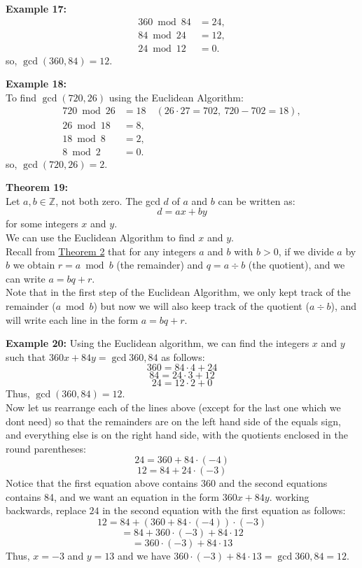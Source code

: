 \documentclass[12pt]{article}
\begin{document}
\noindent\textbf{Example 17:}
\label{ex:euclid360}
\begin{align*}
360 \bmod 84 &= 24, \\
84 \bmod 24 &= 12, \\
24 \bmod 12 &= 0.
\end{align*}
so, $\gcd(360,84) = 12$.

\vspace{5mm}

\noindent\textbf{Example 18:}
\label{ex:euclid720}
\\To find $\gcd(720,26)$ using the Euclidean Algorithm:
\begin{align*}
720 \bmod 26 &= 18 \quad(26\cdot 27 = 702,\ 720-702=18), \\   
26 \bmod 18 &= 8, \\
18 \bmod 8 &= 2, \\
8 \bmod 2 &= 0.
\end{align*}
so, $\gcd(720,26) = 2$.

\newpage
\noindent\textbf{Theorem 19:}
\label{thm:bezout}
\\Let $a,b \in \mathbb{Z}$, not both zero. 
The gcd $d$ of $a$ and $b$ can be written as:
\[
d = ax + by
\]
for some integers $x$ and $y$.  
\\We can use the Euclidean Algorithm to find $x$ and $y$.  
\\Recall from \hyperref[thm:division]{Theorem 2} that for any integers 
$a$ and $b$ with $b>0$, if we divide $a$ by $b$ we obtain $r=a \bmod b$ (the remainder) and $q=a \div b$ (the quotient), and we can write $a=bq+r$.
\\Note that in the first step of the Euclidean Algorithm, we only kept track of the 
remainder ($a \bmod b$) but now we will also keep track of the quotient ($a \div b$),
and will write each line in the form $a=bq+r$.


\vspace{5mm}
\noindent\textbf{Example 20:}
Using the Euclidean algorithm, we can find the integers $x$ and $y$ such that $360x+84y=\gcd{360,84}$ as follows:
\[
360 = 84 \cdot 4 + 24
\]
\[
84 = 24 \cdot 3 + 12
\]
\[
24 = 12 \cdot 2 + 0
\]
Thus, $\gcd(360,84) = 12$.
\\Now let us rearrange each of the lines above (except for the last one which we dont need) so that the remainders are on the left hand side of the equals sign, and everything else is on the right hand side, with the quotients enclosed in the round parentheses:
\[
24 = 360 + 84 \cdot (-4)
\]
\[
12 = 84 + 24 \cdot (-3)
\]
Notice that the first equation above contains 360 and the second equations contains 84, and we want an equation in the form $360x + 84y$. working backwards, replace $24$ in the second equation with the first equation as follows:
\[12 = 84 + (360 + 84 \cdot (-4)) \cdot (-3)\]
\[= 84 + 360 \cdot (-3) + 84 \cdot 12\]
\[= 360 \cdot (-3) + 84 \cdot 13\]
Thus, $x=-3$ and $y=13$ and we have $360 \cdot (-3) + 84 \cdot 13 = \gcd{360,84} = 12$.
\end{document}
